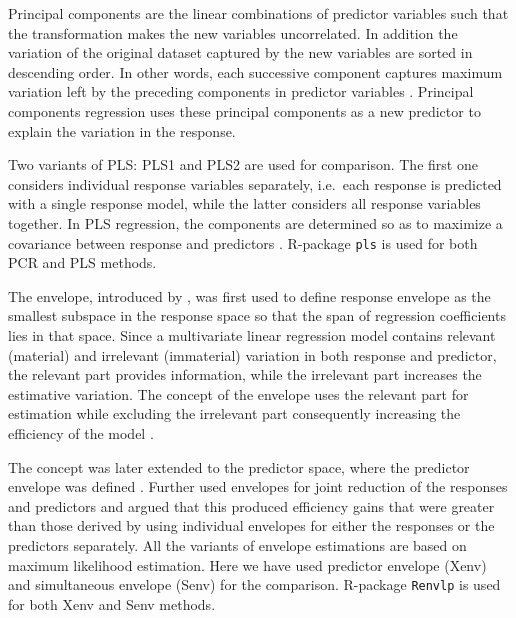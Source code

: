 \documentclass[review]{elsarticle}
\providecommand{\tightlist}{%
  \setlength{\itemsep}{0pt}\setlength{\parskip}{0pt}}
\begin{document}
\begin{description}
\tightlist
\item[\emph{Principal Components Regression (PCR):}]
Principal components are the linear combinations of predictor variables
such that the transformation makes the new variables uncorrelated. In
addition the variation of the original dataset captured by the new
variables are sorted in descending order. In other words, each
successive component captures maximum variation left by the preceding
components in predictor variables \citep{Jolliffe2002}. Principal
components regression uses these principal components as a new predictor
to explain the variation in the response.
\item[\emph{Partial Least Squares (PLS):}]
Two variants of PLS: PLS1 and PLS2 are used for comparison. The first
one considers individual response variables separately, i.e.~each
response is predicted with a single response model, while the latter
considers all response variables together. In PLS regression, the
components are determined so as to maximize a covariance between
response and predictors \citep{DeJong1993}. R-package \texttt{pls}
\citep{pls2018} is used for both PCR and PLS methods.
\item[\emph{Envelopes:}]
The envelope, introduced by \citet{Cook2007a}, was first used to define
response envelope \citep{cook2010envelope} as the smallest subspace in
the response space so that the span of regression coefficients lies in
that space. Since a multivariate linear regression model contains
relevant (material) and irrelevant (immaterial) variation in both
response and predictor, the relevant part provides information, while
the irrelevant part increases the estimative variation. The concept of
the envelope uses the relevant part for estimation while excluding the
irrelevant part consequently increasing the efficiency of the model
\citep{cook2016algorithms}.

The concept was later extended to the predictor space, where the
predictor envelope was defined \citep{cook2013envelopes}. Further
\citet{cook2015simultaneous} used envelopes for joint reduction of the
responses and predictors and argued that this produced efficiency gains
that were greater than those derived by using individual envelopes for
either the responses or the predictors separately. All the variants of
envelope estimations are based on maximum likelihood estimation. Here we
have used predictor envelope (Xenv) and simultaneous envelope (Senv) for
the comparison. R-package \texttt{Renvlp} \citep{env2018} is used for
both Xenv and Senv methods.
\end{description}
\end{document}
